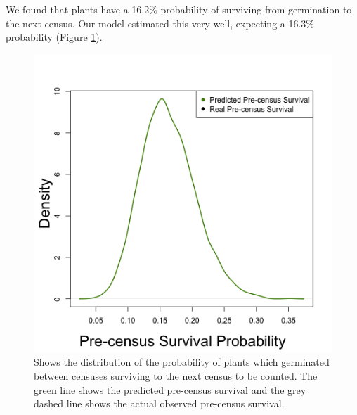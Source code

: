 \documentclass[11pt]{article}
\begin{document}
We found that plants have a 16.2\% probability of surviving from germination to the next census.
Our model estimated this very well, expecting a 16.3\% probability (Figure \ref{app:AppA_Pre_Census_Surv}).

\begin{figure}
	\includegraphics[width=0.91\linewidth]{Figures/seed_surv.png}
	\caption{Shows the distribution of the probability of plants which germinated between censuses surviving to the next census to be counted. The green line shows the predicted pre-census survival and the grey dashed line shows the actual observed pre-census survival.  }
	\label{app:AppA_Pre_Census_Surv}
\end{figure}
\end{document}
